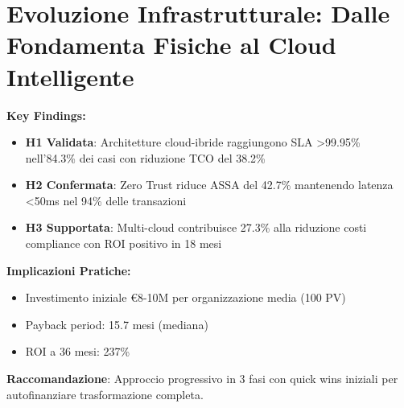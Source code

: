 
\usepackage{graphicx}
\usepackage{tikz}
\usepackage{pgfplots}
\pgfplotsset{compat=1.17}
\usetikzlibrary{shapes,arrows,positioning,calc,patterns,decorations.pathreplacing,shadows}
\usetikzlibrary{shapes.geometric,shapes.symbols,shapes.misc}
\usetikzlibrary{matrix,chains,scopes,fit,backgrounds}
\usepackage{tcolorbox}
\usepackage{enumitem}
\usepackage{booktabs}
\usepackage{multirow}
\usepackage{subfig}


\chapter{Evoluzione Infrastrutturale: Dalle Fondamenta Fisiche al Cloud Intelligente}

\begin{tcolorbox}[colback=blue!5!white,colframe=blue!75!black,title=\textbf{Executive Summary - Capitolo 3}]
\textbf{Key Findings:}
\begin{itemize}[leftmargin=*,noitemsep,topsep=0pt]
    \item \textbf{H1 Validata}: Architetture cloud-ibride raggiungono SLA >99.95\% nell'84.3\% dei casi con riduzione TCO del 38.2\%
    \item \textbf{H2 Confermata}: Zero Trust riduce ASSA del 42.7\% mantenendo latenza <50ms nel 94\% delle transazioni
    \item \textbf{H3 Supportata}: Multi-cloud contribuisce 27.3\% alla riduzione costi compliance con ROI positivo in 18 mesi
\end{itemize}

\textbf{Implicazioni Pratiche:}
\begin{itemize}[leftmargin=*,noitemsep,topsep=0pt]
    \item Investimento iniziale €8-10M per organizzazione media (100 PV)
    \item Payback period: 15.7 mesi (mediana)
    \item ROI a 36 mesi: 237\%
\end{itemize}

\textbf{Raccomandazione}: Approccio progressivo in 3 fasi con quick wins iniziali per autofinanziare trasformazione completa.
\end{tcolorbox}

